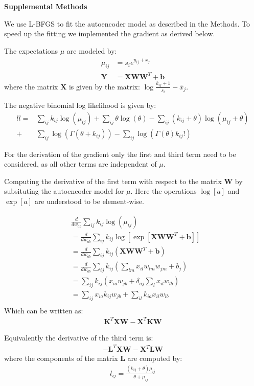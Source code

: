 \documentclass[11pt]{letter}
\newcommand{\matr}[1]{\mathbf{#1}}
\begin{document}
\textbf{Supplemental Methods}

We use L-BFGS to fit the autoencoder model as described in the Methods.
To speed up the fitting we implemented the gradient as derived below.

The expectations $\mu$ are modeled by:
\begin{align*}
\mu_{ij} &= s_{i} e^{y_{ij} + \bar{x}_j}\\
\matr{Y} &= \matr{X} \matr{W} \matr{W}^T + \matr{b}
\end{align*}
where the matrix $\matr{X}$ is given by the matrix: $\log{\frac{k_{ij}+1}{s_i}} - \bar{x}_j$. 

The negative binomial log likelihood is given by:
\begin{align*}
ll=& \sum_{ij} k_{ij} \log{(\mu_{ij})} + 
\sum_{ij} \theta \log{(\theta)} -
\sum_{ij} (k_{ij} + \theta) \log{(\mu_{ij} + \theta)} \\
+&\sum_{ij} \log{(\Gamma(\theta + k_{ij}))} 
- \sum_{ij} \log{(\Gamma({\theta}) k_{ij}!)}
\end{align*}

For the derivation of the gradient only the first and third term need to be considered, 
as all other terms are independent of $\mu$.

Computing the derivative of the first term with respect to the matrix $\matr{W}$ by subsituting the autoencoder model for $\mu$. Here the operations $\log[a]$ and $\exp[a]$ are understood to be element-wise.

\begin{align*}
&\frac{d}{dw_{ab}}\sum_{ij} k_{ij} \log{(\mu_{ij})} \\
&= \frac{d}{dw_{ab}}\sum_{ij} k_{ij} \log{[\exp{[\matr{X} \matr{W} \matr{W}^T + \matr{b}]}]} \\
&= \frac{d}{dw_{ab}}\sum_{ij} k_{ij} (\matr{X} \matr{W} \matr{W}^T + \matr{b}) \\
&= \frac{d}{dw_{ab}}\sum_{ij} k_{ij} (\sum_{lm} x_{il} w_{lm} w_{jm} + b_j) \\
&= \sum_{ij} k_{ij} (x_{ia} w_{jb} + \delta_{aj} \sum_{l} x_{il}w_{lb}) \\
&= \sum_{ij} x_{ia} k_{ij} w_{jb} + \sum_{il} k_{ia} x_{il} w_{lb} \\
\end{align*}
Which can be written as:
\begin{align*}
\matr{K}^T \matr{X} \matr{W} - \matr{X}^T \matr{K} \matr{W}
\end{align*}

Equivalently the derivative of the third term is:
\begin{align*}
-\matr{L}^T \matr{X} \matr{W} - \matr{X}^T \matr{L} \matr{W}
\end{align*}
where the components of the matrix $\matr{L}$ are computed by:
\begin{align*}
l_{ij} = \frac{(k_{ij} + \theta) \mu_{ij}}{\theta + \mu_{ij}}   
\end{align*}
\end{document}
